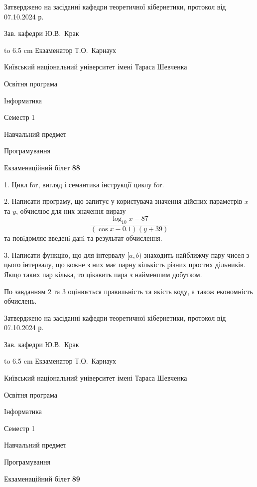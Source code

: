 \documentclass[12pt, ukrainian]{article}
\begin{document}
{\smallskip\smallskip \begin {scriptsize} Затверджено на засіданні кафедри теоретичної кібернетики, протокол   від   07.10.2024 р.\par\smallskip\smallskip\smallskip\smallskip
{\parbox {6.5 cm} {Зав. кафедри \dotfill Ю.В.~Крак}}\hspace {0.7cm} {\hbox to 6.5 cm { Екзаменатор \dotfill Т.О.~Карнаух}} \end{scriptsize}}
\newpage
{{\begin {scriptsize}\par
{ \center  Київський національний університет імені Тараса Шевченка \par}
{\parbox {5 cm}{Освітня програма \hfill}{\parbox {7 cm}{Інформатика\hfill}}\parbox {6 cm}{\hfill Семестр 1}}\par
{\parbox {5 cm} {Навчальний предмет \hfill}\parbox {7 cm}{Програмування \hfill}\parbox {6cm}{\hfill}\par}\vspace{-15pt} \end{scriptsize}}{\center Екзаменаційний білет \No \textbf { 88 }\par}}
{%
1. Цикл for, вигляд і семантика інструкції циклу for.%
\par
2. Написати програму, що запитує у користувача значення дійсних параметрів $x$ та $y$, обчислює для них значення виразу 
$$\frac{\log_{10} x - 87}{(\cos x - 0.1) (y + 39)}$$ 
та повiдомляє введенi данi та результат обчислення.

\par
3. Написати функцію, що для інтервалу $[a, b)$ знаходить найближчу пару чисел з цього інтервалу, що кожне з них має парну кількість різних простих дільників. Якщо таких пар кілька, то цікавить пара з найменшим добутком.

По завданням 2 та 3 оцінюється правильність та якість коду, а також економність обчислень.

}
{\smallskip\smallskip \begin {scriptsize} Затверджено на засіданні кафедри теоретичної кібернетики, протокол   від   07.10.2024 р.\par\smallskip\smallskip\smallskip\smallskip
{\parbox {6.5 cm} {Зав. кафедри \dotfill Ю.В.~Крак}}\hspace {0.7cm} {\hbox to 6.5 cm { Екзаменатор \dotfill Т.О.~Карнаух}} \end{scriptsize}}
\vspace{0.9cm}
{{\begin {scriptsize}\par
{ \center  Київський національний університет імені Тараса Шевченка \par}
{\parbox {5 cm}{Освітня програма \hfill}{\parbox {7 cm}{Інформатика\hfill}}\parbox {6 cm}{\hfill Семестр 1}}\par
{\parbox {5 cm} {Навчальний предмет \hfill}\parbox {7 cm}{Програмування \hfill}\parbox {6cm}{\hfill}\par}\vspace{-15pt} \end{scriptsize}}{\center Екзаменаційний білет \No \textbf { 89 }\par}}
\end{document}
